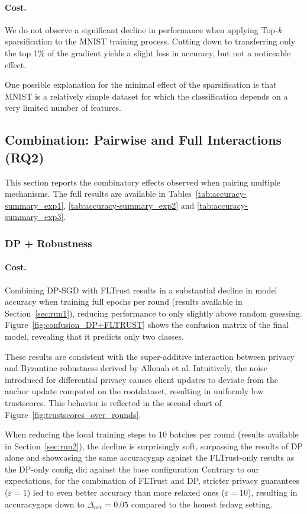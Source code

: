\documentclass[11pt,twocolumn,a4paper,DIV=calc,parskip=half]{scrartcl}
\begin{document}
	\paragraph{Cost.}
	We do not observe a significant decline in performance when applying Top-$k$ sparsification to the MNIST training process. Cutting down to transferring only the top 1\% of the gradient yields a slight loss in accuracy, but not a noticeable effect.
	
	One possible explanation for the minimal effect of the sparsification is that MNIST is a relatively simple dataset for which the classification depends on a very limited number of features.
	
	\subsection{Combination: Pairwise and Full Interactions (RQ2)}
	
	This section reports the combinatory effects observed when pairing multiple mechanisms.
	The full results are available in Tables~\ref{tab:accuracy-summary_exp1}, \ref{tab:accuracy-summary_exp2} and \ref{tab:accuracy-summary_exp3}.
	\subsubsection{\ac{DP} + Robustness}
	
	\paragraph{Cost.}
	Combining \ac{DP-SGD} with FLTrust results in a substantial decline in model accuracy when training full epochs per round (results available in Section~\ref{sec:run1}), reducing performance to only slightly above random guessing. Figure~\ref{fig:confusion_DP+FLTRUST} shows the confusion matrix of the final model, revealing that it predicts only two classes.
	
	These results are consistent with the super-additive interaction between privacy and Byzantine robustness derived by Allouah et al. Intuitively, the noise introduced for differential privacy causes client updates to deviate from the anchor update computed on the \gls{rootdataset}, resulting in uniformly low \glspl{trustscore}. This behavior is reflected in the second chart of Figure~\ref{fig:trustscores_over_rounds}.
	
	When reducing the local training steps to 10 batches per round (results available in Section~\ref{sec:run2}), the decline is surprisingly soft, surpassing the results of \ac{DP} alone and showcasing the same \gls{accuracygap} against the FLTrust-only results as the \ac{DP}-only config did against the base configuration
	Contrary to our expectations, for the combination of FLTrust and \ac{DP}, stricter privacy guarantees ($\varepsilon=1$) led to even better accuracy than more relaxed ones ($\varepsilon=10$), resulting in \glspl{accuracygap} down to $\Delta_{acc}=0.05$ compared to the honest \gls{fedavg} setting.
	
\end{document}
